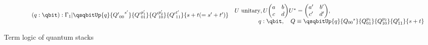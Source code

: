 \begin{figure}[htbp]
\[\begin{gathered}
{{\begin{array}{ll}
           \qquad\qquad(q:\qbit):\Gamma_1 | 
              {\protect{\qsqbitUp{q}{{{Q'}_{00}}^{s'}}{{Q'}_{01}^{p'_1}}%
                            {{Q'}_{10}^{p'_2}}{{Q'}_{11}^{t'}}{s+t(=s'+t')}}}
            \end{array}}}
   {\protect{\begin{array}{ll}
               U\ \mathrm{unitary}, U 
                {\protect{
                   \begin{pmatrix}a&b\\c&d\end{pmatrix}}} U^{*} 
              = {\protect{\begin{pmatrix}a'&b'\\c'&d'\end{pmatrix}}}, \\
             \qquad\qquad q:\qbit,\quad Q\equiv 
                {\protect{\qsqbitUp{q}{{Q_{00}}^{s}}{{Q}_{01}^{p_1}}%
                            {{Q}_{10}^{p_2}}{{Q}_{11}^{t}}{s+t}}}
    \end{array}} }
\end{gathered}
\]

\caption{Term logic of quantum stacks}\label{fig:qstacktermlogic}
\end{figure}
